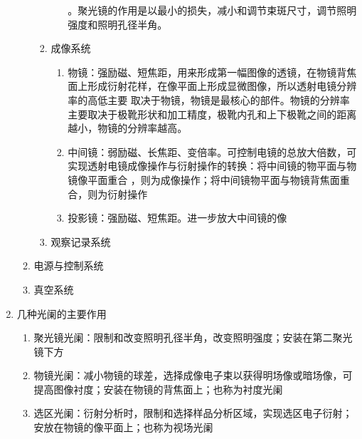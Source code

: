 \documentclass[12pt,a4paper]{article}
\begin{document}
\begin{enumerate}
\begin{enumerate}
\begin{enumerate}
\begin{enumerate}
                    。聚光镜的作用是以最小的损失，减小和调节束斑尺寸，调节照明强度和照明孔径半角。
                \end{enumerate}
                \item 成像系统
                \begin{enumerate}
                    \item 物镜：强励磁、短焦距，用来形成第一幅图像的透镜，在物镜背焦面上形成衍射花样，在像平面上形成显微图像，所以透射电镜分辨率的高低主要
                    取决于物镜，物镜是最核心的部件。物镜的分辨率主要取决于极靴形状和加工精度，极靴内孔和上下极靴之间的距离越小，物镜的分辨率越高。
                    \item 中间镜：弱励磁、长焦距、变倍率。可控制电镜的总放大倍数，可实现透射电镜成像操作与衍射操作的转换：将中间镜的物平面与物镜像平面重合
                    ，则为成像操作；将中间镜物平面与物镜背焦面重合，则为衍射操作
                    \item 投影镜：强励磁、短焦距。进一步放大中间镜的像
                \end{enumerate}
                \item 观察记录系统
            \end{enumerate}
            \item 电源与控制系统
            \item 真空系统
        \end{enumerate}
        \item 几种光阑的主要作用
        \begin{enumerate}
            \item 聚光镜光阑：限制和改变照明孔径半角，改变照明强度；安装在第二聚光镜下方
            \item 物镜光阑：减小物镜的球差，选择成像电子束以获得明场像或暗场像，可提高图像衬度；安装在物镜的背焦面上；也称为衬度光阑
            \item 选区光阑：衍射分析时，限制和选择样品分析区域，实现选区电子衍射；安放在物镜的像平面上；也称为视场光阑
        \end{enumerate}
    \end{enumerate}
\end{document}
